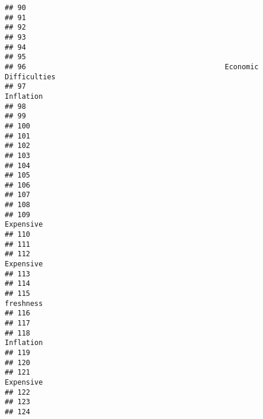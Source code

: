 \documentclass[
]{article}
\begin{document}
\begin{verbatim}
## 90                                                                     
## 91                                                                     
## 92                                                                     
## 93                                                                     
## 94                                                                     
## 95                                                                     
## 96                                               Economic Difficulties 
## 97                                                           Inflation 
## 98                                                                     
## 99                                                                     
## 100                                                                    
## 101                                                                    
## 102                                                                    
## 103                                                                    
## 104                                                                    
## 105                                                                    
## 106                                                                    
## 107                                                                    
## 108                                                                    
## 109                                                          Expensive 
## 110                                                                    
## 111                                                                    
## 112                                                          Expensive 
## 113                                                                    
## 114                                                                    
## 115                                                           freshness
## 116                                                                    
## 117                                                                    
## 118                                                          Inflation 
## 119                                                                    
## 120                                                                    
## 121                                                          Expensive 
## 122                                                                    
## 123                                                                    
## 124                                                                    

\end{verbatim}
\end{document}

